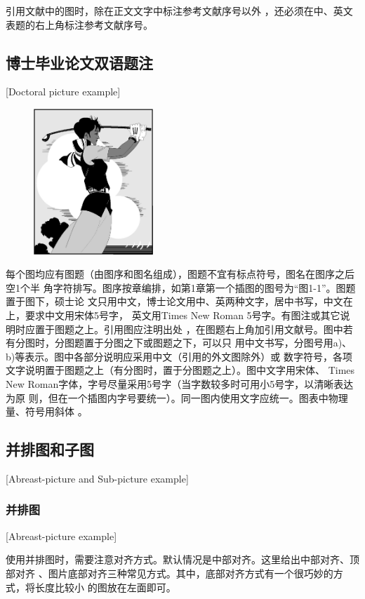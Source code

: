 引用文献中的图时，除在正文文字中标注参考文献序号以外
，还必须在中、英文表题的右上角标注参考文献序号。

\subsection{博士毕业论文双语题注}[Doctoral picture example]
\begin{figure}[htpb]
  \centering
  \includegraphics[width = 0.4\textwidth]{golfer}
\end{figure}

每个图均应有图题（由图序和图名组成），图题不宜有标点符号，图名在图序之后空1个半
角字符排写。图序按章编排，如第1章第一个插图的图号为“图1-1”。图题置于图下，硕士论
文只用中文，博士论文用中、英两种文字，居中书写，中文在上，要求中文用宋体5号字，
英文用Times New Roman 5号字。有图注或其它说明时应置于图题之上。引用图应注明出处
，在图题右上角加引用文献号。图中若有分图时，分图题置于分图之下或图题之下，可以只
用中文书写，分图号用a)、b)等表示。图中各部分说明应采用中文（引用的外文图除外）或
数字符号，各项文字说明置于图题之上（有分图时，置于分图题之上）。图中文字用宋体、
Times New Roman字体，字号尽量采用5号字（当字数较多时可用小5号字，以清晰表达为原
则，但在一个插图内字号要统一）。同一图内使用文字应统一。图表中物理量、符号用斜体
。

\subsection{并排图和子图}[Abreast-picture and Sub-picture example]
\subsubsection{并排图}[Abreast-picture example]

使用并排图时，需要注意对齐方式。默认情况是中部对齐。这里给出中部对齐、顶部对齐
、图片底部对齐三种常见方式。其中，底部对齐方式有一个很巧妙的方式，将长度比较小
的图放在左面即可。

